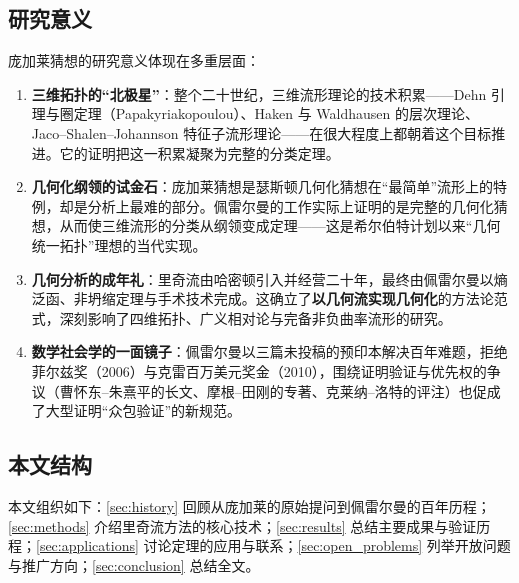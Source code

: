 \subsection{研究意义}

庞加莱猜想的研究意义体现在多重层面：

\begin{enumerate}[label=(\arabic*)]
    \item \textbf{三维拓扑的“北极星”}：整个二十世纪，三维流形理论的技术积累——Dehn 引理与圈定理（Papakyriakopoulou\cite{papakyriakou1957}）、Haken 与 Waldhausen 的层次理论、Jaco--Shalen--Johannson 特征子流形理论——在很大程度上都朝着这个目标推进。它的证明把这一积累凝聚为完整的分类定理。
    \item \textbf{几何化纲领的试金石}：庞加莱猜想是瑟斯顿几何化猜想\cite{thurston1982}在“最简单”流形上的特例，却是分析上最难的部分。佩雷尔曼的工作实际上证明的是完整的几何化猜想，从而使三维流形的分类从纲领变成定理——这是希尔伯特计划以来“几何统一拓扑”理想的当代实现。
    \item \textbf{几何分析的成年礼}：里奇流由哈密顿\cite{hamilton1982}引入并经营二十年，最终由佩雷尔曼以熵泛函、非坍缩定理与手术技术完成。这确立了\textbf{以几何流实现几何化}的方法论范式，深刻影响了四维拓扑、广义相对论与完备非负曲率流形的研究。
    \item \textbf{数学社会学的一面镜子}：佩雷尔曼以三篇未投稿的预印本解决百年难题，拒绝菲尔兹奖（2006）与克雷百万美元奖金（2010），围绕证明验证与优先权的争议（曹怀东--朱熹平的长文、摩根--田刚的专著、克莱纳--洛特的评注）也促成了大型证明“众包验证”的新规范。
\end{enumerate}

\subsection{本文结构}

本文组织如下：\cref{sec:history} 回顾从庞加莱的原始提问到佩雷尔曼的百年历程；\cref{sec:methods} 介绍里奇流方法的核心技术；\cref{sec:results} 总结主要成果与验证历程；\cref{sec:applications} 讨论定理的应用与联系；\cref{sec:open_problems} 列举开放问题与推广方向；\cref{sec:conclusion} 总结全文。
